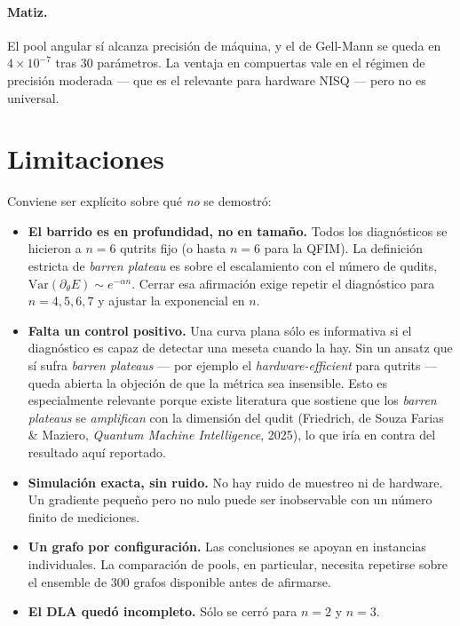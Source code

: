\documentclass[11pt,a4paper]{article}
\begin{document}
\paragraph{Matiz.} El pool angular sí alcanza precisión de máquina, y el de
Gell-Mann se queda en $4\times10^{-7}$ tras 30 parámetros. La ventaja en
compuertas vale en el régimen de precisión moderada --- que es el relevante
para hardware NISQ --- pero no es universal.

\section{Limitaciones}

Conviene ser explícito sobre qué \emph{no} se demostró:

\begin{itemize}
\item \textbf{El barrido es en profundidad, no en tamaño.} Todos los
diagnósticos se hicieron a $n=6$ qutrits fijo (o hasta $n=6$ para la QFIM). La
definición estricta de \emph{barren plateau} es sobre el escalamiento con el
número de qudits, $\mathrm{Var}(\partial_\theta E)\sim e^{-\alpha n}$. Cerrar
esa afirmación exige repetir el diagnóstico para $n=4,5,6,7$ y ajustar la
exponencial en $n$.

\item \textbf{Falta un control positivo.} Una curva plana sólo es informativa
si el diagnóstico es capaz de detectar una meseta cuando la hay. Sin un ansatz
que sí sufra \emph{barren plateaus} --- por ejemplo el \emph{hardware-efficient}
para qutrits --- queda abierta la objeción de que la métrica sea insensible.
Esto es especialmente relevante porque existe literatura que sostiene que los
\emph{barren plateaus} se \emph{amplifican} con la dimensión del qudit
(Friedrich, de Souza Farias \& Maziero, \emph{Quantum Machine Intelligence},
2025), lo que iría en contra del resultado aquí reportado.

\item \textbf{Simulación exacta, sin ruido.} No hay ruido de muestreo ni de
hardware. Un gradiente pequeño pero no nulo puede ser inobservable con un
número finito de mediciones.

\item \textbf{Un grafo por configuración.} Las conclusiones se apoyan en
instancias individuales. La comparación de pools, en particular, necesita
repetirse sobre el ensemble de 300 grafos disponible antes de afirmarse.

\item \textbf{El DLA quedó incompleto.} Sólo se cerró para $n=2$ y $n=3$.
\end{itemize}
\end{document}
